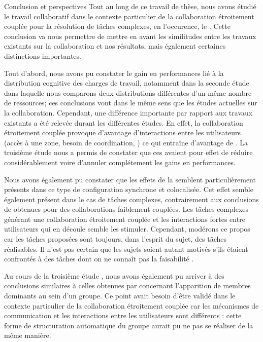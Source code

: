 \documentclass[myfrancais,ngerman,english,french]{mythesis}
\begin{document}
	\begin{mychapter+}{Conclusion et perspectives}
		Tout au long de ce travail de thèse, nous avons étudié le travail collaboratif dans le contexte particulier de la collaboration étroitement couplée pour la résolution de tâches complexes, en l'occurence, le .
		Cette conclusion va nous permettre de mettre en avant les similitudes entre les travaux existants sur la collaboration et nos résultats, mais également certaines distinctions importantes.

		Tout d'abord, nous avons pu constater le gain en performances lié à la distribution cognitive des charges de travail, notamment dans la seconde étude  dans laquelle nous comparons deux distributions différentes d'un même nombre de ressources; ces conclusions vont dans le même sens que les études actuelles sur la collaboration.
		Cependant, une différence importante par rapport aux travaux existants a été relevée durant les différentes études.
		En effet, la collaboration étroitement couplée provoque d'avantage d'interactions entre les utilisateurs (accès à une zone, besoin de coordination, \myetc) ce qui entraîne d'avantage de .
		La troisième étude nous a permis de constater que ces  avaient pour effet de réduire considérablement voire d'annuler complétement les gains en performances.

		Nous avons également pu constater que les effets de la  semblent particulièrement présents dans ce type de configuration synchrone et colocalisée.
		Cet effet semble également présent dans le cas de tâches complexes, contrairement aux conclusions de  obtenues pour des collaborations faiblement couplées.
		Les tâches complexes générant une collaboration étroitement couplée et les interactions fortes entre utilisateurs qui en découle semble les stimuler.
		Cependant, modérons ce propos car les tâches proposées sont toujours, dans l'esprit du sujet, des tâches réalisables.
		Il n'est pas certain que les sujets soient autant motivés s'ils étaient confrontés à des tâches dont on ne connaît pas la faisabilité \myapriori.

		Au cours de la troisième étude , nous avons également pu arriver à des conclusions similaires à celles obtenues par  concernant l'apparition de membres dominants au sein d'un groupe.
		Ce point avait besoin d'être validé dans le contexte particulier de la collaboration étroitement couplée car les mécanismes de communication et les interactions entre les utilisateurs sont différents : cette forme de structuration automatique du groupe aurait pu ne pas se réaliser de la même manière.


\end{mychapter+}
\end{document}
